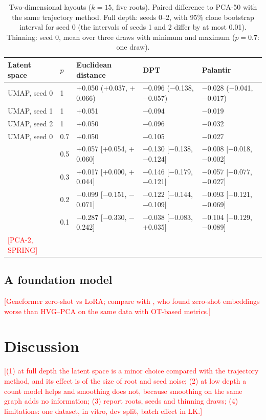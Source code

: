 \documentclass[10pt,a4paper,twocolumn]{article}
\newcommand{\todo}[1]{\textcolor{red}{[#1]}}
\begin{document}
\begin{table}[t]
\centering\small
\caption{Two-dimensional layouts ($k=15$, five roots). Paired difference to PCA-50 with the same
trajectory method. Full depth: seeds 0--2, with 95\% clone bootstrap interval for seed 0 (the
intervals of seeds 1 and 2 differ by at most 0.01). Thinning: seed 0,
mean over three draws with minimum and maximum ($p=0.7$: one draw).}
\label{tab:twod}
\scriptsize
\setlength{\tabcolsep}{3pt}
\begin{tabular}{lllll}
\toprule
Latent space & $p$ & Euclidean distance & DPT & Palantir \\
\midrule
UMAP, seed 0 & 1 & $+$0.050 ($+$0.037, $+$0.066) & $-$0.096 ($-$0.138, $-$0.057) & $-$0.028 ($-$0.041, $-$0.017) \\
UMAP, seed 1 & 1 & $+$0.051 & $-$0.094 & $-$0.019 \\
UMAP, seed 2 & 1 & $+$0.050 & $-$0.096 & $-$0.032 \\
\midrule
UMAP, seed 0 & 0.7 & $+$0.050 & $-$0.105 & $-$0.027 \\
             & 0.5 & $+$0.057 [$+$0.054, $+$0.060] & $-$0.130 [$-$0.138, $-$0.124] & $-$0.008 [$-$0.018, $-$0.002] \\
             & 0.3 & $+$0.017 [$+$0.000, $+$0.044] & $-$0.146 [$-$0.179, $-$0.121] & $-$0.057 [$-$0.077, $-$0.027] \\
             & 0.2 & $-$0.099 [$-$0.151, $-$0.071] & $-$0.122 [$-$0.144, $-$0.109] & $-$0.093 [$-$0.121, $-$0.069] \\
             & 0.1 & $-$0.287 [$-$0.330, $-$0.242] & $-$0.038 [$-$0.083, $+$0.035] & $-$0.104 [$-$0.129, $-$0.089] \\
\midrule
\todo{PCA-2, SPRING} & & & & \\
\bottomrule
\end{tabular}
\end{table}

\subsection{A foundation model}
\todo{Geneformer zero-shot vs LoRA; compare with \cite{TODO-zhou2026}, who found zero-shot
embeddings worse than HVG--PCA on the same data with OT-based metrics.}

\section{Discussion}
\todo{(1) at full depth the latent space is a minor choice compared with the trajectory method,
and its effect is of the size of root and seed noise; (2) at low depth a count model helps and
smoothing does not, because smoothing on the same graph adds no information; (3) report roots,
seeds and thinning draws; (4) limitations: one dataset, in vitro, dev split, batch effect in LK.}
\end{document}
